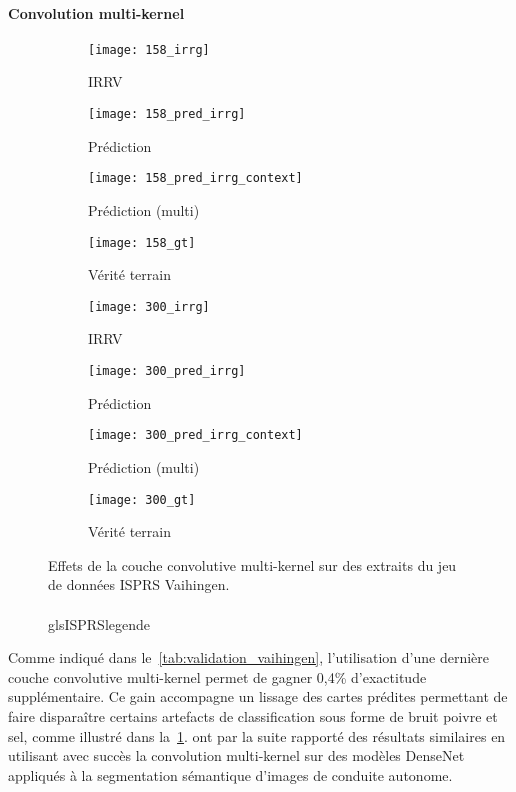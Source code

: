 \paragraph{Convolution multi-kernel}
\begin{figure}[t]
  \captionsetup[subfigure]{singlelinecheck=off,justification=centering}
  \captionsetup[subfigure]{labelformat=empty}
  \begin{subfigure}[t]{0.125\textwidth}
    \texttt{[image: 158\_irrg]}
    \caption{\gls{IRRV}}
  \end{subfigure}%
  \begin{subfigure}[t]{0.125\textwidth}
    \texttt{[image: 158\_pred\_irrg]}
    \caption{Prédiction}
  \end{subfigure}%
  \begin{subfigure}[t]{0.125\textwidth}
    \texttt{[image: 158\_pred\_irrg\_context]}
    \caption{Prédiction (multi)}
  \end{subfigure}%
  \begin{subfigure}[t]{0.125\textwidth}
    \texttt{[image: 158\_gt]}
    \caption{Vérité terrain}
  \end{subfigure}%
	\begin{subfigure}[t]{0.125\textwidth}
		\texttt{[image: 300\_irrg]}
		\caption{\gls{IRRV}}
	\end{subfigure}%
	\begin{subfigure}[t]{0.125\textwidth}
		\texttt{[image: 300\_pred\_irrg]}
		\caption{Prédiction}
	\end{subfigure}%
	\begin{subfigure}[t]{0.125\textwidth}
		\texttt{[image: 300\_pred\_irrg\_context]}
		\caption{Prédiction (multi)}
	\end{subfigure}%
	\begin{subfigure}[t]{0.125\textwidth}
		\texttt{[image: 300\_gt]}
		\caption{Vérité terrain}
	\end{subfigure}
  \caption{Effets de la couche convolutive multi-kernel sur des extraits du jeu de données \gls{ISPRS} Vaihingen.\\
	\\gls{ISPRS}legende}
  \label{fig:patches_context}
\end{figure}

Comme indiqué dans le~\cref{tab:validation_vaihingen}, l'utilisation d'une dernière couche convolutive multi-kernel permet de gagner 0,4\% d'exactitude supplémentaire. Ce gain accompagne un lissage des cartes prédites permettant de faire disparaître certains artefacts de classification sous forme de bruit poivre et sel, comme illustré dans la~\cref{fig:patches_context}.
\citet{brahimi_multiscale_2018} ont par la suite rapporté des résultats similaires en utilisant avec succès la convolution multi-kernel sur des modèles DenseNet appliqués à la segmentation sémantique d'images de conduite autonome.

